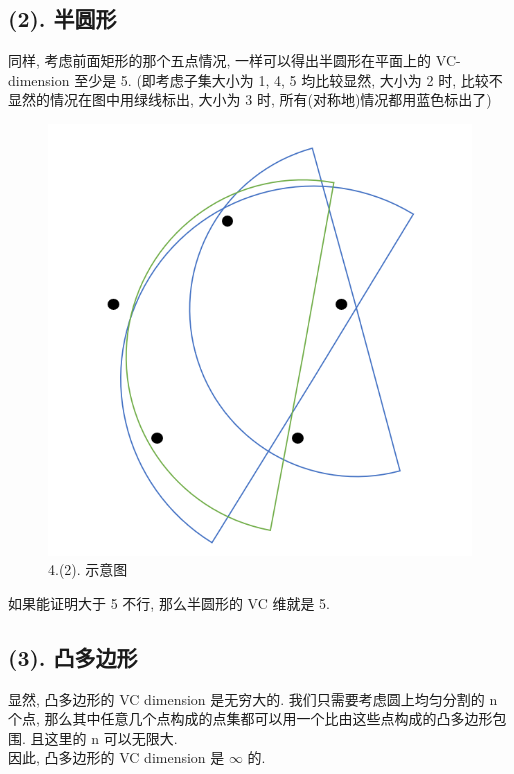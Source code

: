 \documentclass[UTF8]{article}
\begin{document}
\subsection*{(2). 半圆形}
\noindent 同样, 考虑前面矩形的那个五点情况, 一样可以得出半圆形在平面上的 VC-dimension 至少是 5. (即考虑子集大小为 1, 4, 5 均比较显然, 大小为 2 时, 比较不显然的情况在图中用绿线标出, 大小为 3 时, 所有(对称地)情况都用蓝色标出了)
\begin{center}
	\begin{figure}[H]
		\centering
		\includegraphics[width=\linewidth/3]{image/4.2.png}
		\caption{4.(2). 示意图}
	\end{figure}
\end{center}
如果能证明大于 5 不行, 那么半圆形的 VC 维就是 5.

\subsection*{(3). 凸多边形}
\noindent 显然, 凸多边形的 VC dimension 是无穷大的. 我们只需要考虑圆上均匀分割的 n 个点, 那么其中任意几个点构成的点集都可以用一个比由这些点构成的凸多边形包围. 且这里的 n 可以无限大.\\
因此, 凸多边形的 VC dimension 是 $\infty$ 的.
\end{document}
